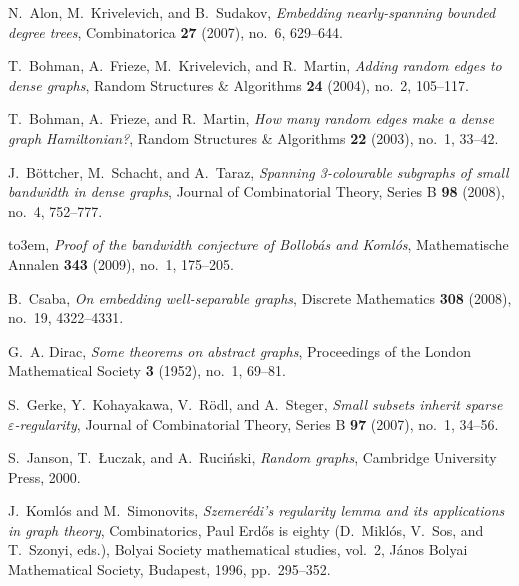 \documentclass[11pt,english]{article}
\theoremstyle{plain}
\theoremstyle{plain}
\theoremstyle{plain}
\theoremstyle{plain}
\theoremstyle{plain}
\theoremstyle{definition}
\theoremstyle{definition}
\theoremstyle{remark}
\theoremstyle{remark}
\theoremstyle{plain}
\theoremstyle{definition}
\theoremstyle{definition}
\theoremstyle{plain}
\theoremstyle{plain}
\theoremstyle{plain}
\theoremstyle{plain}
\theoremstyle{remark}
\theoremstyle{plain}
\theoremstyle{definition}
\begin{document}
\providecommand{\bysame}{\leavevmode\hbox to3em{\hrulefill}\thinspace}
\providecommand{\MR}{\relax\ifhmode\unskip\space\fi MR }
\providecommand{\MRhref}[2]{%
  \href{http://www.ams.org/mathscinet-getitem?mr=#1}{#2}
}
\providecommand{\href}[2]{#2}
\begin{thebibliography}{10}

N.~Alon, M.~Krivelevich, and B.~Sudakov, \emph{Embedding nearly-spanning
  bounded degree trees}, Combinatorica \textbf{27} (2007), no.~6, 629--644.

T.~Bohman, A.~Frieze, M.~Krivelevich, and R.~Martin, \emph{Adding random edges
  to dense graphs}, Random Structures \& Algorithms \textbf{24} (2004), no.~2,
  105--117.

T.~Bohman, A.~Frieze, and R.~Martin, \emph{How many random edges make a dense
  graph {H}amiltonian?}, Random Structures \& Algorithms \textbf{22} (2003),
  no.~1, 33--42.

J.~B{\"o}ttcher, M.~Schacht, and A.~Taraz, \emph{Spanning 3-colourable
  subgraphs of small bandwidth in dense graphs}, Journal of Combinatorial
  Theory, Series B \textbf{98} (2008), no.~4, 752--777.

\bysame, \emph{Proof of the bandwidth conjecture of {B}ollob{\'a}s and
  {K}oml{\'o}s}, Mathematische Annalen \textbf{343} (2009), no.~1, 175--205.

B.~Csaba, \emph{On embedding well-separable graphs}, Discrete Mathematics
  \textbf{308} (2008), no.~19, 4322--4331.

G.~A. Dirac, \emph{Some theorems on abstract graphs}, Proceedings of the London
  Mathematical Society \textbf{3} (1952), no.~1, 69--81.

S.~Gerke, Y.~Kohayakawa, V.~R{\"o}dl, and A.~Steger, \emph{Small subsets
  inherit sparse $\varepsilon$-regularity}, Journal of Combinatorial Theory,
  Series B \textbf{97} (2007), no.~1, 34--56.

S.~Janson, T.~{\L{}}uczak, and A.~Ruci{\'n}ski, \emph{Random graphs}, Cambridge
  University Press, 2000.

J.~Koml\'os and M.~Simonovits, \emph{Szemer\'edi's regularity lemma and its
  applications in graph theory}, Combinatorics, {P}aul {E}rd\H{o}s is eighty
  (D.~Mikl\'os, V.~Sos, and T.~Szonyi, eds.), Bolyai Society mathematical
  studies, vol.~2, J\'anos {B}olyai Mathematical Society, Budapest, 1996,
  pp.~295--352.


\end{thebibliography}
\end{document}
